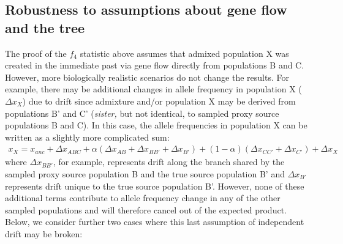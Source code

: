 \documentclass[12pt]{report}
\begin{document}
\subsection{Robustness to assumptions about gene flow and the tree}
The proof of the $f_4$ statistic above assumes that admixed population X was created in the immediate past via gene flow directly from populations B and C. However, more biologically realistic scenarios do not change the results. For example, there may be additional changes in allele frequency in population X ($\Delta{x_X}$) due to drift since admixture and/or population X may be derived from populations B' and C' (\textit{sister,} but not identical, to sampled proxy source populations B and C). In this case, the allele frequencies in population X can be written as a slightly more complicated sum: 
	\begin{align*}
	x_X = x_{anc} + \Delta{x_{ABC}} + \alpha(\Delta{x_{AB}} + \Delta{x_{BB'}} + \Delta{x_{B'}}) + (1 - \alpha)(\Delta{x_{CC'}} + \Delta{x_{C'}}) + \Delta{x_X}
	\end{align*}
where $\Delta{x_{BB'}}$, for example, represents drift along the branch shared by the sampled proxy source population B and the true source population B' and $\Delta{x_{B'}}$ represents drift unique to the true source population B'.
However, none of these additional terms contribute to allele frequency change in any of the other sampled populations and will therefore cancel out of the expected product. Below, we consider further two cases where this last assumption of independent drift may be broken: 
\end{document}
